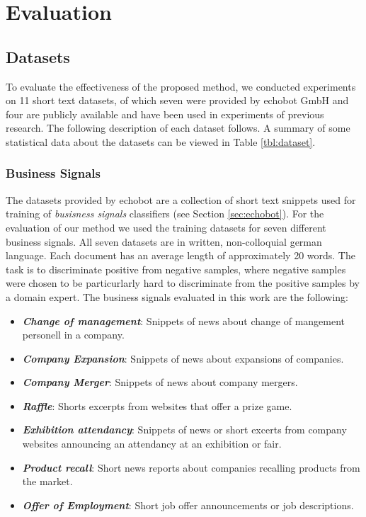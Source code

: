 \chapter{Evaluation}
\label{ch:Evaluation}

\section{Datasets}

To evaluate the effectiveness of the proposed method, we conducted experiments
on 11 short text datasets, of which seven were provided by echobot GmbH and four
are publicly available and have been used in experiments of previous research.
The following description of each dataset follows. A summary of some statistical
data about the datasets can be viewed in Table \ref{tbl:dataset}. 

\subsection{Business Signals}

The datasets provided by echobot are a collection of short text snippets used
for training of \emph{busisness signals} classifiers (see Section
\ref{sec:echobot}).
For the evaluation of our method we used the training datasets for seven different business signals. 
All seven datasets are in written, non-colloquial german language. Each
document has an average length of approximately 20 words. The task is to
discriminate positive from negative samples, where negative samples were chosen
to be particurlarly hard to discriminate from the positive samples by a domain expert.
The business signals evaluated in this work are the following:

\begin{itemize}
  \setlength\itemsep{0.1em}
  \item \textbf{\textit{Change of management}}: Snippets of news about change of
  mangement personell in a company.
  \item \textbf{\textit{Company Expansion}}: Snippets of news about expansions of
  companies.
  \item \textbf{\textit{Company Merger}}: Snippets of news about company
  mergers.
  \item \textbf{\textit{Raffle}}: Shorts excerpts from websites that offer a prize game. 
  \item \textbf{\textit{Exhibition attendancy}}: Snippets of news or short excerts from
  company websites announcing an attendancy at an exhibition or fair.
  \item \textbf{\textit{Product recall}}: Short news reports about companies recalling
  products from the market.
  \item \textbf{\textit{Offer of Employment}}: Short job offer announcements or
  job descriptions.
\end{itemize}

